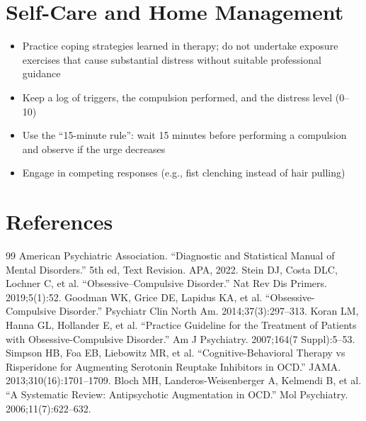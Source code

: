 \section*{Self-Care and Home Management}
\begin{itemize}
  \item Practice coping strategies learned in therapy; do not undertake exposure exercises that cause substantial distress without suitable professional guidance
  \item Keep a log of triggers, the compulsion performed, and the distress level (0--10)
  \item Use the ``15-minute rule'': wait 15 minutes before performing a compulsion and observe if the urge decreases
  \item Engage in competing responses (e.g., fist clenching instead of hair pulling)
\end{itemize}

\section*{References}
\begin{thebibliography}{99}
 American Psychiatric Association. ``Diagnostic and Statistical Manual of Mental Disorders.'' 5th ed, Text Revision. APA, 2022.
 Stein DJ, Costa DLC, Lochner C, et al. ``Obsessive--Compulsive Disorder.'' Nat Rev Dis Primers. 2019;5(1):52.
 Goodman WK, Grice DE, Lapidus KA, et al. ``Obsessive-Compulsive Disorder.'' Psychiatr Clin North Am. 2014;37(3):297--313.
 Koran LM, Hanna GL, Hollander E, et al. ``Practice Guideline for the Treatment of Patients with Obsessive-Compulsive Disorder.'' Am J Psychiatry. 2007;164(7 Suppl):5--53.
 Simpson HB, Foa EB, Liebowitz MR, et al. ``Cognitive-Behavioral Therapy vs Risperidone for Augmenting Serotonin Reuptake Inhibitors in OCD.'' JAMA. 2013;310(16):1701--1709.
 Bloch MH, Landeros-Weisenberger A, Kelmendi B, et al. ``A Systematic Review: Antipsychotic Augmentation in OCD.'' Mol Psychiatry. 2006;11(7):622--632.
\end{thebibliography}
